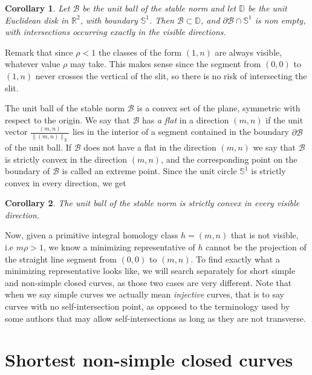 \documentclass{article}
\newcommand{\DD}{\mathbb{D}}
\newcommand{\RR}{\mathbb{R}}
\renewcommand{\SS}{\mathbb{S}}
\newcommand{\Bb}{\mathcal{B}}
\newcommand{\St}[1]{\|#1\|_X}
\newtheorem{cor}{Corollary}[thm]
\theoremstyle{definition}
\begin{document}
\begin{cor}
	Let $\Bb$ be the unit ball of the stable norm and let $\DD$ be the unit Euclidean disk in $\RR^2$, with boundary $\SS^1$. Then $\Bb \subset \DD$, and $\partial\Bb \cap \SS^1$ is non empty, with intersections occurring exactly in the visible directions.
\end{cor}

 Remark that since $\rho < 1$ the classes of the form $(1,n)$ are always visible, whatever value $\rho$ may take. This makes sense since the segment from $(0,0)$ to $(1,n)$ never crosses the vertical of the slit, so there is no risk of intersecting the slit. \newline 

The unit ball of the stable norm $\Bb$ is a convex set of the plane, symmetric with respect to the origin. We say that $\Bb$ has \emph{a flat} in a direction $(m,n)$ if the unit vector $\frac{(m,n)}{\St{(m,n)}}$ lies in the interior of a segment contained in the boundary $\partial \Bb$ of the unit ball. If $\Bb$ does not have a flat in the direction $(m,n)$ we say that $\Bb$ is strictly convex in the direction $(m,n)$, and the corresponding point on the boundary of $\Bb$ is called an extreme point. Since the unit circle $\SS^1$ is strictly convex in every direction, we get

\begin{cor}
	The unit ball of the stable norm is strictly convex in every visible direction.
\end{cor}

Now, given a primitive integral homology class $h=(m,n)$ that is not visible, i.e $m\rho> 1$, we know a minimizing representative of $h$ cannot be the projection of the straight line segment from $(0,0)$ to $(m,n)$. To find exactly what a minimizing representative looks like, we will search separately for short simple and non-simple closed curves, as those two cases are very different. Note that when we say simple curves we actually mean \emph{injective} curves, that is to say curves with no self-intersection point, as opposed to the terminology used by some authors that may allow self-intersections as long as they are not transverse.







\section{Shortest non-simple closed curves}
\end{document}
